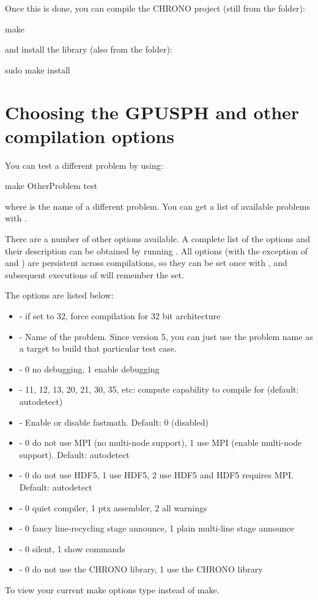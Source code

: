 \documentclass{../GPUSPHtemplate}
\begin{document}
Once this is done, you can compile the CHRONO project
(still from the  folder):
\begin{shellcode}
make
\end{shellcode}
and install the library (also from the  folder):
\begin{shellcode}
sudo make install
\end{shellcode}



\section{Choosing the GPUSPH  and other compilation options}\label{sec:compileoptions}

You can test a different problem by using:
\begin{shellcode}
make OtherProblem test
\end{shellcode}
where  is the name of a different problem. You can get
a list of available problems with .

There are a number of other options available. A complete list of the
options and their description can be obtained by running . All options (with the exception of  and
) are persistent across compilations, so they can be set once
with , and subsequent executions of 
will remember the  set.

The  options are listed below:
\begin{itemize}
\item {} - if set to 32, force compilation for 32 bit architecture
\item {} - Name of the problem. Since version 5, you can just use the problem name as a target to build that particular test case.
\item {} - 0 no debugging, 1 enable debugging
\item {} - 11, 12, 13, 20, 21, 30, 35, etc: compute capability to compile for (default: autodetect)
\item {} - Enable or disable fastmath. Default: 0 (disabled)
\item {} - 0 do not use MPI (no multi-node support), 1 use MPI (enable multi-node support). Default: autodetect
\item {} - 0 do not use HDF5, 1 use HDF5, 2 use HDF5 and HDF5 requires MPI. Default: autodetect
\item {} - 0 quiet compiler, 1 ptx assembler, 2 all warnings
\item {} - 0 fancy line-recycling stage announce, 1 plain multi-line stage announce
\item {} - 0 silent, 1 show commands
\item {} - 0 do not use the CHRONO library, 1 use the CHRONO library
\end{itemize}
To view your current make options type  instead of make.
\end{document}

